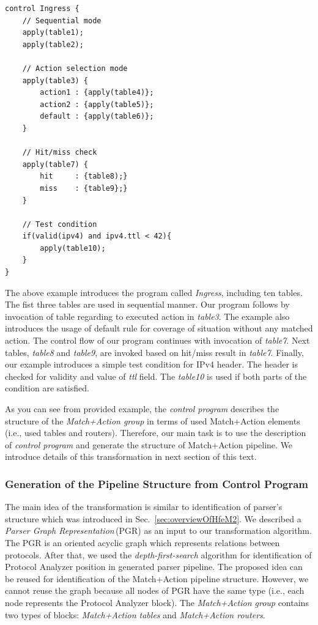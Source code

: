 \begin{Verbatim}[fontsize=\small]
control Ingress {
    // Sequential mode
    apply(table1);
    apply(table2);
    
    // Action selection mode
    apply(table3) {
        action1 : {apply(table4)};
        action2 : {apply(table5)};
        default : {apply(table6)};
    }
    
    // Hit/miss check     
    apply(table7) {
        hit     : {table8);}
        miss    : {table9};}
    }

    // Test condition
    if(valid(ipv4) and ipv4.ttl < 42){
        apply(table10);
    }
}
\end{Verbatim}

The above example introduces the program called \textit{Ingress}, including ten tables. The fist three tables are used in sequential manner.
Our program follows by invocation of table regarding to executed action in \textit{table3}. The example also introduces the usage of 
default rule for coverage of situation without any matched action. The control flow of our program continues with invocation of \textit{table7}. 
Next tables, \textit{table8} and \textit{table9}, are invoked based on hit/miss result in \textit{table7}. 
Finally, our example introduces a simple test condition for IPv4 header. The header is checked for validity and value of \textit{ttl}
field. The \textit{table10} is used if both parts of the condition are satisfied.

As you can see from provided example, the \emph{control program} describes the structure of the \emph{Match+Action group} in terms
of used Match+Action elements (i.e., used tables and routers). Therefore, our main task is to use the description of \emph{control program} 
and generate the structure of Match+Action pipeline. We introduce details of this transformation in next section of this text.

\subsubsection{Generation of the Pipeline Structure from Control Program}
\label{sec:generateOfThePipelineStructureFromControlProgram}
The main idea of the transformation is similar to identification of parser's structure which was introduced in 
Sec.~\ref{sec:overviewOfHfeM2}. 
We described a \textit{Parser Graph Representation}\,(PGR) as an input to our
transformation algorithm. The PGR is an oriented acyclic graph which represents relations between protocols. 
After that, we used the \textit{depth-first-search} algorithm for identification of Protocol Analyzer position in generated parser pipeline. 
The proposed idea can be reused for identification of the Match+Action pipeline structure. 
However, we cannot reuse the graph because all nodes of PGR have the same type (i.e., each node represents the Protocol Analyzer block).
The \emph{Match+Action group} contains two types of blocks: \emph{Match+Action tables} and \emph{Match+Action routers}.


